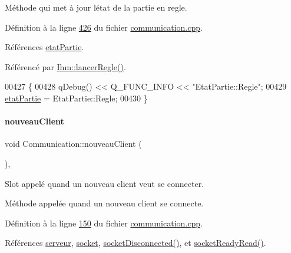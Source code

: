 Méthode qui met à jour l\textquotesingle{}état de la partie en regle. 



Définition à la ligne \hyperlink{communication_8cpp_source_l00426}{426} du fichier \hyperlink{communication_8cpp_source}{communication.\+cpp}.



Références \hyperlink{communication_8h_source_l00100}{etat\+Partie}.



Référencé par \hyperlink{ihm_8cpp_source_l00623}{Ihm\+::lancer\+Regle()}.


\begin{DoxyCode}
00427 \{
00428     qDebug() << Q\_FUNC\_INFO << \textcolor{stringliteral}{"EtatPartie::Regle"};
00429     \hyperlink{class_communication_a2539ded2780db2c732690c585c768c96}{etatPartie} = EtatPartie::Regle;
00430 \}
\end{DoxyCode}
\mbox{\label{class_communication_ac1bc22603b6e05389f94890b745aac4f}} 
\paragraph{\texorpdfstring{nouveau\+Client}{nouveauClient}}
{\footnotesize\ttfamily void Communication\+::nouveau\+Client (\begin{DoxyParamCaption}{ }\end{DoxyParamCaption})\hspace{0.3cm}{\ttfamily [private]}, {\ttfamily [slot]}}



Slot appelé quand un nouveau client veut se connecter. 

Méthode appelée quand un nouveau client se connecte. 

Définition à la ligne \hyperlink{communication_8cpp_source_l00150}{150} du fichier \hyperlink{communication_8cpp_source}{communication.\+cpp}.



Références \hyperlink{communication_8h_source_l00094}{serveur}, \hyperlink{communication_8h_source_l00095}{socket}, \hyperlink{communication_8cpp_source_l00317}{socket\+Disconnected()}, et \hyperlink{communication_8cpp_source_l00166}{socket\+Ready\+Read()}.



